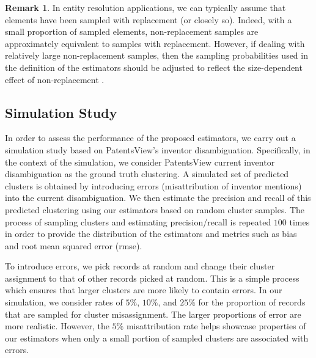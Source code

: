 \documentclass[fontsize=11pt]{article}
\theoremstyle{definition}
\newtheorem{remark}{Remark}
\begin{document}

\begin{remark}
    In entity resolution applications, we can typically assume that elements have been sampled with replacement (or closely so). Indeed, with a small proportion of sampled elements, non-replacement samples are approximately equivalent to samples with replacement. However, if dealing with relatively large non-replacement samples, then the sampling probabilities used in the definition of the estimators should be adjusted to reflect the size-dependent effect of non-replacement \citep{Horvitz1952}.
\end{remark}

\subsection{Simulation Study}\label{sec:simulation_study}

In order to assess the performance of the proposed estimators, we carry out a simulation study based on PatentsView's inventor disambiguation. Specifically, in the context of the simulation, we consider PatentsView current inventor disambiguation as the ground truth clustering. A simulated set of predicted clusters is obtained by introducing errors (misattribution of inventor mentions) into the current disambiguation. We then estimate the precision and recall of this predicted clustering using our estimators based on random cluster samples. The process of sampling clusters and estimating precision/recall is repeated $100$ times in order to provide the distribution of the estimators and metrics such as bias and root mean squared error (rmse). 

To introduce errors, we pick records at random and change their cluster assignment to that of other records picked at random. This is a simple process which ensures that larger clusters are more likely to contain errors. In our simulation, we consider rates of $5\%$, $10\%$, and $25\%$ for the proportion of records that are sampled for cluster misassignment. The larger proportions of error are more realistic. However, the $5\%$ misattribution rate helps showcase properties of our estimators when only a small portion of sampled clusters are associated with errors.
\end{document}
